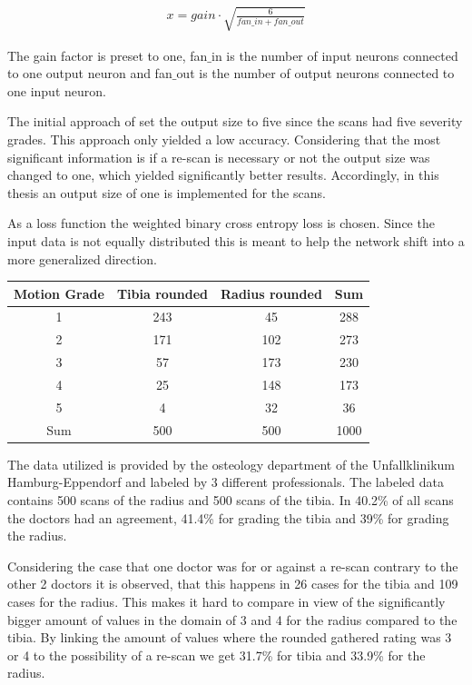 \documentclass[
a4paper, 
12pt,
grayscalebody, %
abstract=on,
twoside, BCOR10mm, 12pt, DIV13,headinclude, footexclude, final, abstracton, openright
]{ibireprt}
\numberwithin{equation}{chapter}
\numberwithin{table}{chapter}
\numberwithin{figure}{chapter}
\numberwithin{algorithm}{chapter}
\numberwithin{example}{chapter}
\numberwithin{example}{chapter}
\begin{document}
\begin{align}
	x = gain \cdot \sqrt{\frac{6}{fan\_in + fan\_out}}
\end{align}  

The gain factor is preset to one, fan$\_$in is the number of input neurons connected to one output neuron and fan$\_$out is the number of output neurons connected to one input neuron.

The initial approach of \cite{Walle2023} set the output size to five since the scans had five severity grades. This approach only yielded a low accuracy. Considering that the most significant information is if a re-scan is necessary or not the output size was changed to one, which yielded significantly better results. Accordingly, in this thesis an output size of one is implemented for the scans.

As a loss function the weighted binary cross entropy loss is chosen. Since the input data is not equally distributed this is meant to help the network shift into a more generalized direction.

\begin{center}
	\begin{tabular}{||c|c|c||c||}
		
		Motion Grade&  Tibia rounded& Radius rounded & Sum 	\\
		\hline
		\hline
		1 &  243&  45& 288   \\
		\hline
		2 &  171 & 102&  273\\
		\hline
		3 &  57&  173&  230 \\
		\hline
		4 &   25 & 148&  173 \\
		\hline
		5 &  4& 32&   36\\
		\hline
		\hline
		Sum&500&500&1000\\
		
		\hline
	\end{tabular}
\end{center}

The data utilized is provided by the osteology department of the Unfallklinikum Hamburg-Eppendorf and labeled by 3 different professionals.
The labeled data contains 500 scans of the radius and 500 scans of the tibia. In  40.2\% of all scans the doctors had an agreement, 41.4\% for grading the tibia and 39\% for grading the radius. 

Considering the case that one doctor was for or against a re-scan contrary to the other 2 doctors it is observed, that this happens in 26 cases for the tibia and 109 cases for the radius. This makes it hard to compare in view of the significantly bigger amount of values in the domain of 3 and 4 for the radius compared to the tibia. By linking the amount of values where the rounded gathered rating was 3 or 4 to the possibility of a re-scan we get 31.7\% for tibia and 33.9\% for the radius.  %
\end{document}
